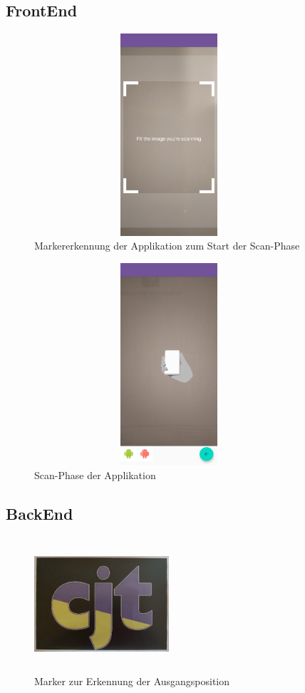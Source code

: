 \subsection*{FrontEnd}
\begin{figure}[hbt!]
    \centering
    \includegraphics[width=10cm,height=7.5cm,keepaspectratio]{4Umsetzung/Bilder/image_tracking.jpg}
    \caption{Markererkennung der Applikation zum Start der Scan-Phase}
    \label{pic:image_tracking}
\end{figure}
\begin{figure}[hbt!]
    \centering
    \includegraphics[width=10cm,height=7.5cm,keepaspectratio]{4Umsetzung/Bilder/scan-phase.jpg}
    \caption{Scan-Phase der Applikation}
    \label{pic:scan}
\end{figure}
\subsection*{BackEnd}
\begin{figure}[hbt!]
    \centering
    \includegraphics[width=5cm,height=5cm,keepaspectratio]{4Umsetzung/Bilder/cjt_logo_tracking.png}
    \caption{Marker zur Erkennung der Ausgangsposition}
    \label{pic:initialMarker}
\end{figure}

